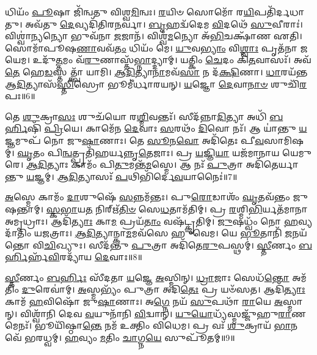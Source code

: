 𑌧𑌿𑌯𑌂᳴ \ul{𑌪𑍂}\-𑌷𑌾 𑌜𑌿᳴𑌨𑍍𑌵𑌤𑍁 𑌵𑌿𑌶𑍍𑌵\-\ul{𑌮𑌿}\-𑌨𑍍𑌵𑌃।
\-\ul{𑌰}\-𑌯𑌿𑍞 𑌸𑍋𑌮𑍋᳴ 𑌰\-\ul{𑌯𑌿}\-𑌪𑌤𑌿᳴𑌰𑍍𑌦𑌧𑌾𑌤𑍁।
𑌅𑌵᳴𑌤𑍁 \ul{𑌦𑍇}\-𑌵𑍍𑌯𑌦𑌿᳴𑌤𑌿𑌰\-\ul{𑌨}\-𑌰𑍍𑌵𑌾।
\-\ul{𑌬𑍃}\-𑌹𑌦𑍍𑌵᳴𑌦𑍇𑌮 \ul{𑌵𑌿}\-𑌦𑌥𑍇᳴ \ul{𑌸𑍁}\-𑌵𑍀𑌰𑌾𑌃॑।
𑌵𑌿𑌶𑍍𑌵𑌾॑\-\ul{𑌨𑍍𑌯}\-𑌨𑍍𑌯𑍋 𑌭𑍁𑌵᳴𑌨𑌾 \ul{𑌜}\-𑌜𑌾𑌨᳴।
𑌵𑌿𑌶𑍍𑌵᳴\-\ul{𑌮}\-𑌨𑍍𑌯𑍋 𑌅᳴\-\ul{𑌭𑌿}\-𑌚𑌕𑍍𑌷𑌾᳴𑌣 𑌏𑌤𑌿।
𑌸𑍋𑌮𑌾᳴𑌪𑍂𑌷\-\ul{𑌣𑌾}\-𑌵𑌵᳴\-\ul{𑌤𑌂} 𑌧𑌿𑌯𑌂᳴ 𑌮𑍇।
\-\ul{𑌯𑍁}\-𑌵\-\ul{𑌭𑍍𑌯𑌾𑌂} 𑌵𑌿\-\ul{𑌶𑍍𑌵𑌾𑌃} 𑌪𑍃𑌤᳴𑌨𑌾 𑌜𑌯𑍇𑌮।
𑌉𑌦𑍁᳴\-\ul{𑌤𑍍𑌤}\-𑌮𑌂 𑌵᳴\-\ul{𑌰𑍁}\-𑌣𑌾𑌸𑍍𑌤᳴\-\ul{𑌭𑍍𑌨𑌾}\-𑌦𑍍𑌦𑍍𑌯𑌾𑌮𑍍।
𑌯𑌤𑍍𑌕𑌿𑌂 \ul{𑌚𑍇}\-𑌦𑌂 𑌕𑌿᳴\-\ul{𑌤}\-𑌵𑌾𑌸𑌃᳴।
𑌅𑌵᳴ \ul{𑌤𑍇} 𑌹𑍇\-\ul{𑌡}\-𑌸𑍍𑌤𑌤𑍍𑌤𑍍𑌵𑌾᳴ 𑌯𑌾𑌮𑌿।
\-\ul{𑌆}\-\-\ul{𑌦𑌿}\-𑌤𑍍𑌯𑌾\-\ul{𑌨𑌾}\-𑌮𑌵᳴\-\ul{𑌸𑌾} 𑌨 𑌦᳴\-\ul{𑌕𑍍𑌷𑌿}\-𑌣𑌾।
\-\ul{𑌧𑌾}\-𑌰𑌯᳴𑌨𑍍𑌤 𑌆\-\ul{𑌦𑌿}\-𑌤𑍍𑌯𑌾𑌸᳴\-\ul{𑌸𑍍𑌤𑌿}\-𑌸𑍍𑌰𑍋 𑌭𑍂𑌮𑍀॑𑌰𑍍𑌧𑌾𑌰𑌯𑌨𑍍।
\-\ul{𑌯}\-𑌜𑍍𑌞𑍋 \ul{𑌦𑍇}\-𑌵𑌾\-\ul{𑌨𑌾}\-\-\ul{𑍞} 𑌶𑍁𑌚𑌿᳴\-\ul{𑌰}\-𑌪𑌃॥6॥\anuvakamend[\-\ul{𑌮}\-\-\ul{𑌨𑍀}\-𑌷𑌾\-𑌽𑌸𑍍𑌤𑍁᳴ \ul{𑌚}\-𑌰𑍍𑌤\-\ul{𑌸𑍍𑌯𑌾}\-𑌸𑍍𑌮𑍇 𑌕𑌿᳴\-\ul{𑌤}\-𑌵𑌾𑌸᳴\-\ul{𑌶𑍍𑌚}\-𑌤𑍍𑌵𑌾𑌰𑌿᳴ 𑌚]

𑌤𑍇 \ul{𑌶𑍁}\-𑌕𑍍𑌰𑌾\-\ul{𑌸𑌃} 𑌶𑍁𑌚᳴𑌯𑍋 𑌰\-\ul{𑌶𑍍𑌮𑌿}\-𑌵𑌨𑍍𑌤𑌃᳴।
𑌸𑍀𑌦᳴𑌨𑍍𑌨𑌾\-\ul{𑌦𑌿}\-𑌤𑍍𑌯𑌾 𑌅𑌧𑌿᳴ \ul{𑌬}\-\-\ul{𑌰𑍍}\-𑌹𑌿𑌷𑌿᳴ \ul{𑌪𑍍𑌰𑌿}\-𑌯𑍇।
𑌕𑌾𑌮𑍇᳴𑌨 \ul{𑌦𑍇}\-𑌵𑌾𑌃 \ul{𑌸}\-𑌰𑌥𑌂᳴ \ul{𑌦𑌿}\-𑌵𑍋 𑌨𑌃᳴।
𑌆 𑌯𑌾॑𑌨𑍍𑌤𑍁 \ul{𑌯}\-𑌜𑍍𑌞𑌮𑍁𑌪᳴ 𑌨𑍋 𑌜𑍁\-\ul{𑌷𑌾}\-𑌣𑌾𑌃।
𑌤𑍇 \ul{𑌸𑍂}\-𑌨\-\ul{𑌵𑍋} 𑌅𑌦𑌿᳴𑌤𑍇𑌃 𑌪𑍀\-\ul{𑌵}\-𑌸𑌾𑌮𑌿𑌷𑌮𑍍॑।
\-\ul{𑌘𑍃}\-𑌤𑌂 𑌪𑌿\-\ul{𑌨𑍍𑌵}\-𑌤𑍍𑌪𑍍𑌰𑌤𑌿᳴\-𑌹𑌰𑍍𑌯𑌨𑍍𑌨𑍃\-\ul{𑌤𑍇}\-𑌜𑌾𑌃।
𑌪𑍍𑌰 \ul{𑌯}\-𑌜𑍍𑌞𑌿\-\ul{𑌯𑌾} 𑌯𑌜᳴𑌮𑌾𑌨𑌾𑌯 𑌯𑍇𑌮𑍁𑌰𑍇।
\-\ul{𑌆}\-\-\ul{𑌦𑌿}\-𑌤𑍍𑌯𑌾𑌃 𑌕𑌾𑌮𑌂᳴ 𑌪𑌿\-\ul{𑌤𑍁}\-𑌮𑌨𑍍𑌤᳴\-\ul{𑌮}\-𑌸𑍍𑌮𑍇।
𑌆 𑌨𑌃᳴ \ul{𑌪𑍁}\-𑌤𑍍𑌰𑌾 𑌅𑌦𑌿᳴𑌤𑍇𑌰𑍍𑌯𑌾𑌨𑍍𑌤𑍁 \ul{𑌯}\-𑌜𑍍𑌞𑌮𑍍।
\-\ul{𑌆}\-\-\ul{𑌦𑌿}\-𑌤𑍍𑌯𑌾𑌸𑌃᳴ \ul{𑌪}\-𑌥𑌿𑌭𑌿᳴𑌰𑍍𑌦𑍇\-\ul{𑌵}\-𑌯𑌾𑌨𑍈𑌃॑॥7॥

\-\ul{𑌅}\-𑌸𑍍𑌮𑍇 𑌕𑌾𑌮𑌂᳴ \ul{𑌦𑌾}\-𑌶𑍁𑌷𑍇᳴ \ul{𑌸}\-𑌨𑍍𑌨𑌮᳴𑌨𑍍𑌤𑌃।
𑌪𑍁\-\ul{𑌰𑍋}\-𑌡𑌾𑌶𑌂᳴ \ul{𑌘𑍃}\-𑌤𑌵᳴𑌨𑍍𑌤𑌂 𑌜𑍁𑌷𑌨𑍍𑌤𑌾𑌮𑍍।
\-\ul{𑌸𑍍𑌕}\-\-\ul{𑌭𑌾}\-𑌯\-\ul{𑌤} 𑌨𑌿𑌰𑍍\mbox{}𑌋᳴\-\ul{𑌤𑌿}\-\-\ul{𑍞} 𑌸𑍇\-\ul{𑌧}\-𑌤𑌾𑌮᳴𑌤𑌿𑌮𑍍।
𑌪𑍍𑌰 \ul{𑌰}\-𑌶𑍍𑌮𑌿\-\ul{𑌭𑌿}\-𑌰𑍍𑌯𑌤᳴𑌮𑌾𑌨𑌾 𑌅𑌮𑍃𑌧𑍍𑌰𑌾𑌃।
𑌆𑌦𑌿᳴\-\ul{𑌤𑍍𑌯𑌾𑌃} 𑌕𑌾\-\ul{𑌮} 𑌪𑍍𑌰𑌯᳴\-\ul{𑌤𑌾𑌂} 𑌵𑌷᳴𑌟𑍍𑌕𑍃𑌤𑌿𑌮𑍍।
\-\ul{𑌜𑍁}\-𑌷𑌧𑍍𑌵𑌂᳴ 𑌨𑍋 \ul{𑌹}\-𑌵𑍍𑌯𑌦𑌾᳴𑌤𑌿𑌂 𑌯𑌜𑌤𑍍𑌰𑌾𑌃।
\-\ul{𑌆}\-\-\ul{𑌦𑌿}\-𑌤𑍍𑌯𑌾𑌨𑍍𑌕𑌾\-\ul{𑌮}\-𑌮𑌵᳴𑌸𑍇 𑌹𑍁𑌵𑍇𑌮।
𑌯𑍇 \ul{𑌭𑍂}\-𑌤𑌾𑌨𑌿᳴ \ul{𑌜}\-𑌨𑌯᳴𑌨𑍍𑌤𑍋 𑌵𑌿\-\ul{𑌚𑌿}\-𑌖𑍍𑌯𑍁𑌃।
𑌸𑍀𑌦᳴𑌨𑍍𑌤𑍁 \ul{𑌪𑍁}\-𑌤𑍍𑌰𑌾 𑌅𑌦𑌿᳴𑌤𑍇\-\ul{𑌰𑍁}\-𑌪𑌸𑍍𑌥𑌮𑍍॑।
\-\ul{𑌸𑍍𑌤𑍀}\-𑌰𑍍𑌣𑌂 \ul{𑌬}\-\-\ul{𑌰𑍍}\-𑌹𑌿𑌰𑍍\mbox{}𑌹᳴\-\ul{𑌵𑌿}\-𑌰𑌦𑍍𑌯𑌾᳴𑌯 \ul{𑌦𑍇}\-𑌵𑌾𑌃॥8॥

\-\ul{𑌸𑍍𑌤𑍀}\-𑌰𑍍𑌣𑌂 \ul{𑌬}\-\-\ul{𑌰𑍍}\-𑌹𑌿𑌃 𑌸𑍀᳴𑌦𑌤𑌾 \ul{𑌯}\-𑌜𑍍𑌞𑍇 \ul{𑌅}\-𑌸𑍍𑌮𑌿𑌨𑍍।
\-\ul{𑌧𑍍𑌰𑌾}\-𑌜𑌾𑌃 𑌸𑍇𑌧᳴\-\ul{𑌨𑍍𑌤𑍋} 𑌅𑌮᳴𑌤𑌿𑌂 \ul{𑌦𑍁}\-𑌰𑍇𑌵𑌾॑𑌮𑍍।
\-\ul{𑌅}\-𑌸𑍍𑌮𑌭𑍍𑌯𑌂᳴ 𑌪𑍁𑌤𑍍𑌰𑌾 𑌅𑌦𑌿\-\ul{𑌤𑍇𑌃} 𑌪𑍍𑌰 𑌯𑍞᳴𑌸𑌤।
𑌆𑌦𑌿᳴\-\ul{𑌤𑍍𑌯𑌾𑌃} 𑌕𑌾𑌮᳴ \ul{𑌹}\-𑌵𑌿𑌷𑍋᳴ 𑌜𑍁\-\ul{𑌷𑌾}\-𑌣𑌾𑌃।
𑌅\-\ul{𑌗𑍍𑌨𑍇} 𑌨𑌯᳴ \ul{𑌸𑍁}\-𑌪𑌥𑌾᳴ \ul{𑌰𑌾}\-𑌯𑍇 \ul{𑌅}\-𑌸𑍍𑌮𑌾𑌨𑍍।
𑌵𑌿𑌶𑍍𑌵𑌾᳴𑌨𑌿 𑌦𑍇𑌵 \ul{𑌵}\-𑌯𑍁𑌨𑌾᳴𑌨𑌿 \ul{𑌵𑌿}\-𑌦𑍍𑌵𑌾𑌨𑍍।
\-\ul{𑌯𑍁}\-\-\ul{𑌯𑍋}\-𑌧𑍍𑌯᳴𑌸𑍍𑌮𑌜𑍍𑌜𑍁᳴𑌹𑍁\-\ul{𑌰𑌾}\-𑌣𑌮𑍇𑌨𑌃᳴।
𑌭𑍂𑌯𑌿᳴𑌷𑍍𑌠𑌾\-\ul{𑌨𑍍𑌤𑍇} 𑌨𑌮᳴ 𑌉𑌕𑍍𑌤𑌿𑌂 𑌵𑌿𑌧𑍇𑌮।
𑌪𑍍𑌰 𑌵𑌃᳴ \ul{𑌶𑍁}\-𑌕𑍍𑌰𑌾𑌯᳴ \ul{𑌭𑌾}\-𑌨𑌵𑍇᳴ 𑌭𑌰𑌧𑍍𑌵𑌮𑍍।
\-\ul{𑌹}\-𑌵𑍍𑌯𑌂 \ul{𑌮}\-𑌤𑌿𑌂 \ul{𑌚𑌾}\-𑌗𑍍𑌨\-\ul{𑌯𑍇} 𑌸𑍁𑌪𑍂᳴𑌤𑌮𑍍॥9॥

